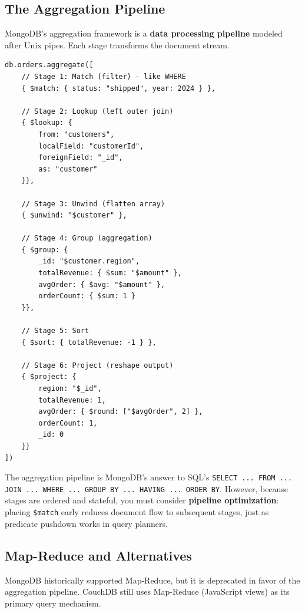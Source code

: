 \documentclass[12pt,a4paper]{article}
\begin{document}
\subsection{The Aggregation Pipeline}

MongoDB's aggregation framework is a \textbf{data processing pipeline} modeled after Unix pipes. Each stage transforms the document stream.

\begin{lstlisting}[language=MongoDB, caption={Aggregation Pipeline Example}]
db.orders.aggregate([
    // Stage 1: Match (filter) - like WHERE
    { $match: { status: "shipped", year: 2024 } },

    // Stage 2: Lookup (left outer join)
    { $lookup: {
        from: "customers",
        localField: "customerId",
        foreignField: "_id",
        as: "customer"
    }},

    // Stage 3: Unwind (flatten array)
    { $unwind: "$customer" },

    // Stage 4: Group (aggregation)
    { $group: {
        _id: "$customer.region",
        totalRevenue: { $sum: "$amount" },
        avgOrder: { $avg: "$amount" },
        orderCount: { $sum: 1 }
    }},

    // Stage 5: Sort
    { $sort: { totalRevenue: -1 } },

    // Stage 6: Project (reshape output)
    { $project: {
        region: "$_id",
        totalRevenue: 1,
        avgOrder: { $round: ["$avgOrder", 2] },
        orderCount: 1,
        _id: 0
    }}
])
\end{lstlisting}

\begin{rdbmsnote}
The aggregation pipeline is MongoDB's answer to SQL's \texttt{SELECT ... FROM ... JOIN ... WHERE ... GROUP BY ... HAVING ... ORDER BY}. However, because stages are ordered and stateful, you must consider \textbf{pipeline optimization}: placing \texttt{\$match} early reduces document flow to subsequent stages, just as predicate pushdown works in query planners.
\end{rdbmsnote}

\subsection{Map-Reduce and Alternatives}

MongoDB historically supported Map-Reduce, but it is deprecated in favor of the aggregation pipeline. CouchDB still uses Map-Reduce (JavaScript views) as its primary query mechanism.
\end{document}
